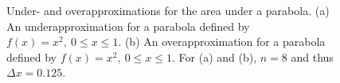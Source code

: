     \begin{figure}[htb]%
\centering
{}%
\hspace{5pt}%
%
    \caption[]{Under- and overapproximations for the area under a parabola. (a) An underapproximation for a parabola defined by $f(x)=x^2,~ 0 \le x \le 1$. (b) An overapproximation for a parabola defined by $f(x)=x^2,~ 0 \le x \le 1$. For (a) and (b), $n=8$ and thus $\Delta x = 0.125$.}
    \label{fig:ApproxAreaParabola}
\end{figure}


